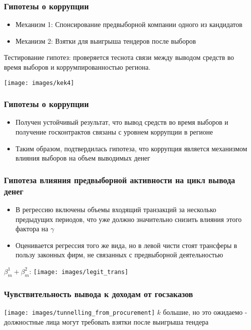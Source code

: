 \begin{frame}
\frametitle{Гипотезы о коррупции}
\begin{itemize}
	\item Механизм 1: Спонсирование предвыборной компании одного из кандидатов
	\item Механизм 2: Взятки для выигрыша тендеров после выборов 
\end{itemize}
Тестирование гипотез: проверяется теснота связи между выводом средств во время выборов и коррумпированностью региона. 
\begin{center}
\texttt{[image: images/kek4]}
\end{center}
\end{frame}

\begin{frame}
\frametitle{Гипотезы о коррупции}
\begin{itemize}
	\item Получен устойчивый результат, что вывод средств во время выборов и получение госконтрактов связаны с уровнем коррупции в регионе
	\item Таким образом, подтвердилась гипотеза, что коррупция является механизмом влияния выборов на объем выводимых денег  
\end{itemize}
\end{frame}

\begin{frame}
\frametitle{Гипотеза влияния предвыборной активности на цикл вывода денег}
\begin{itemize}
	\item В регрессию включены объемы входящий транзакций за несколько предыдущих периодов, что уже должно значительно снизить влияния этого фактора на $\gamma$
	\item Оценивается регрессия того же вида, но в левой чисти стоят трансферы в пользу законных фирм, не связанных с предвыборной деятельностью
\end{itemize}
\end{frame}

\begin{frame}
$\beta^1_m + \beta^2_m$:
\texttt{[image: images/legit\_trans]}
\end{frame}

\begin{frame}
\frametitle{Чувствительность вывода к доходам от госзаказов}
\texttt{[image: images/tunnelling\_from\_procurement]}
$k$ большие, но это ожидаемо - должностные лица могут требовать взятки после выигрыша тендера
\end{frame}

